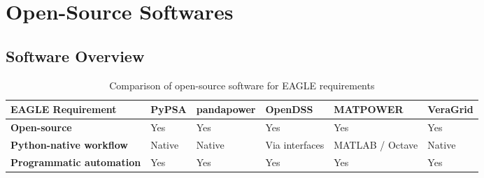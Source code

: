 \chapter{Open-Source Softwares}
\label{chap:software-data}


\section{Software Overview}

\begin{table}[htbp]
\centering
\caption{Comparison of open-source software for EAGLE requirements}
\label{tab:eagle_software}
\renewcommand{\arraystretch}{1.25}
\setlength{\tabcolsep}{3pt}

\begin{adjustbox}{max width=\textwidth}
\begin{tabular}{
>{\raggedright\arraybackslash}p{4.2cm}
>{\raggedright\arraybackslash}p{2.6cm}
>{\raggedright\arraybackslash}p{2.6cm}
>{\raggedright\arraybackslash}p{2.6cm}
>{\raggedright\arraybackslash}p{2.6cm}
>{\raggedright\arraybackslash}p{2.6cm}}
\hline

\textbf{EAGLE Requirement} &
\textbf{PyPSA} &
\textbf{pandapower} &
\textbf{OpenDSS} &
\textbf{MATPOWER} &
\textbf{VeraGrid} \\

\hline


\textbf{Open-source} &
\cellcolor{green!25} Yes &
\cellcolor{green!25} Yes &
\cellcolor{green!25} Yes &
\cellcolor{green!25} Yes &
\cellcolor{green!25} Yes \\

\textbf{Python-native workflow} &
\cellcolor{green!25} Native &
\cellcolor{green!25} Native &
\cellcolor{orange!25} Via interfaces &
\cellcolor{red!25} MATLAB / Octave &
\cellcolor{green!25} Native \\

\textbf{Programmatic automation} &
\cellcolor{green!25} Yes &
\cellcolor{green!25} Yes &
\cellcolor{green!25} Yes &
\cellcolor{green!25} Yes &
\cellcolor{green!25} Yes \\




\end{tabular}
\end{adjustbox}
\end{table}
